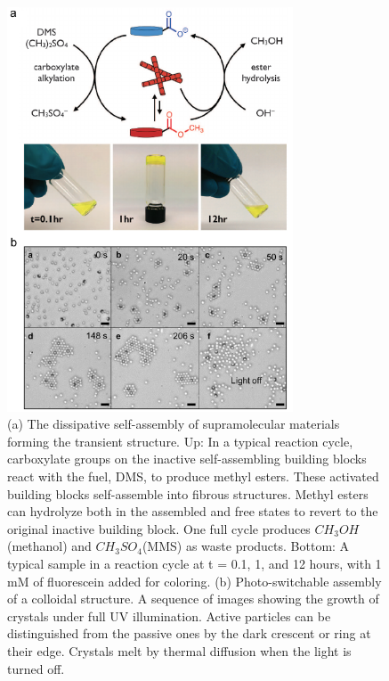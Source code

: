 \begin{appendices}
\begin{figure}[h!]
    \centering
    \includegraphics[width=8.5cm]{figures/A5_BuildingStructures2.pdf}
    \caption{(a) The dissipative  self-assembly of supramolecular materials forming the transient structure. Up: In a typical reaction cycle, carboxylate groups on the inactive self-assembling building blocks  react with the fuel, DMS, to produce methyl esters. These activated building blocks self-assemble into fibrous structures. Methyl esters can hydrolyze both in the assembled and free states to revert to the original inactive building block. One full cycle produces $CH_3OH$ (methanol) and $CH_3SO_4$(MMS) as waste products. Bottom: A typical sample in a reaction cycle at t = 0.1, 1, and 12 hours, with 1 mM of fluorescein added for coloring.   (b) Photo-switchable assembly of a colloidal structure. A sequence of images showing the growth of crystals under full UV illumination. Active particles can be distinguished from the passive ones by the dark crescent or ring at their edge. Crystals melt by thermal diffusion when the light is turned off.  }
    \label{fig:BuldingStructure2}
\end{figure}


\end{appendices}
